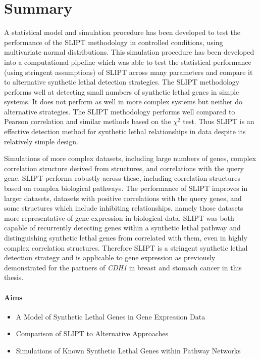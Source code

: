 \section{Summary}

A statistical model and simulation procedure has been developed to test the performance of the \gls{SLIPT} methodology in controlled conditions, using multivariate normal distributions. This simulation procedure has been developed into a computational pipeline which was able to test the statistical performance (using stringent assumptions) of \gls{SLIPT} across many parameters and compare it to alternative \gls{synthetic lethal} detection strategies. The \gls{SLIPT} methodology performs well at detecting small numbers of \gls{synthetic lethal} genes in simple systems. It does not perform as well in more complex systems but neither do alternative strategies. The \gls{SLIPT} methodology performs well compared to Pearson correlation and similar methods based on the $\chi^2$ test. Thus \gls{SLIPT} is an effective detection method for \gls{synthetic lethal} relationships in  data despite its relatively simple design.

Simulations of more complex datasets, including large numbers of genes, complex correlation structure derived from  structures, and correlations with the query gene. \gls{SLIPT} performs robustly across these, including correlation structures based on complex biological pathways. The performance of \gls{SLIPT} improves in larger datasets, datasets with positive correlations with the query genes, and some  structures which include inhibiting relationships, namely those datasets more representative of \gls{gene expression} in biological data. \gls{SLIPT} was both capable of recurrently detecting genes within a \gls{synthetic lethal} pathway and distinguishing \gls{synthetic lethal} genes from correlated with them, even in highly complex correlation structures. Therefore \gls{SLIPT} is a stringent \gls{synthetic lethal} detection strategy and is applicable to \gls{gene expression} as previously demonstrated for the partners of \textit{CDH1} in breast and stomach cancer in this thesis.

\clearpage

\iffalse
\paragraph{Aims}

  \begin{itemize}
   \item A Model of Synthetic Lethal Genes in Gene Expression Data
   
   \bigskip
   
   \item Comparison of SLIPT to Alternative Approaches
   
   \bigskip
   
   \item Simulations of Known Synthetic Lethal Genes within Pathway Networks
      
  \end{itemize}

